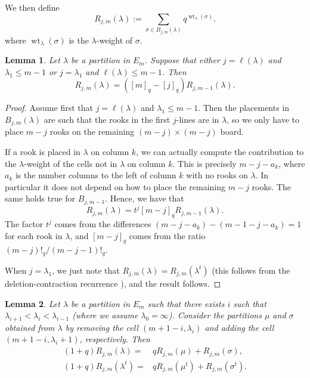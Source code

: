 \documentclass[10pt]{amsart}
\newtheorem{Lem}{Lemma}[section]
\theoremstyle{definition}
\DeclareMathOperator{\wt}{wt}
\begin{document}
We then define
\[
R_{j,m}(\lambda):=\sum_{\sigma\in B_{j,m}(\lambda) } q^{\wt_{\lambda}(\sigma)}.
\]
where $\wt_{\lambda}(\sigma)$ is the $\lambda$-weight of $\sigma$.
\begin{Lem}
\label{lem:Rjm}
Let $\lambda$ be a partition in $E_m$. Suppose that either $j=\ell(\lambda)$ and $\lambda_1\leq m-1$ or $j=\lambda_1$ and $\ell(\lambda)\leq m-1$. Then
\[
R_{j,m}(\lambda)=([m]_q-[j]_q)R_{j,m-1}(\lambda).
\]
\end{Lem}
\begin{proof}
Assume first that $j=\ell(\lambda)$ and $\lambda_1\leq m-1$. Then the placements in $B_{j,m}(\lambda)$ are such that the rooks in the first $j$-lines are in $\lambda$, so we only have to place $m-j$ rooks on the remaining $(m-j)\times (m-j)$ board.

If a rook is placed in $\lambda$ on column $k$, we can actually compute the contribution to the $\lambda$-weight of the cells not in $\lambda$ on column $k$. This is precisely $m-j-a_k$, where $a_k$ is the number columns to the left of column $k$ with no rooks on $\lambda$. In particular it does not depend on how to place the remaining $m-j$ rooks. The same holds true for $B_{j,m-1}$. Hence, we have that
\[
R_{j,m}(\lambda)=t^j[m-j]_qR_{j,m-1}(\lambda).
\]
The factor $t^j$ comes from the differences $(m-j-a_k)-(m-1-j-a_k)=1$ for each rook in $\lambda$, and $[m-j]_q$ comes from the ratio $(m-j)!_q/(m-j-1)!_q$.\par
 When $j=\lambda_1$, we just note that $R_{j,m}(\lambda)=R_{j,m}(\lambda^t)$ (this follows from the deletion-contraction recurrence \cite[Corollary 6.12]{Dworkin}), and the result follows.
\end{proof}
\begin{Lem}
\label{lem:Rjrel}
Let $\lambda$ be a partition in $E_m$ such that there exists $i$ such that $\lambda_{i+1}<\lambda_{i}<\lambda_{i-1}$ (where we assume $\lambda_0=\infty$). Consider the partitions $\mu$ and $\sigma$ obtained from $\lambda$ by removing the cell $(m+1-i,\lambda_i)$ and adding the cell $(m+1-i,\lambda_i+1)$, respectively. Then
\begin{align*}
(1+q)R_{j,m}(\lambda)=&qR_{j,m}(\mu)+R_{j,m}(\sigma),\\
(1+q)R_{j,m}(\lambda^{t})=&qR_{j,m}(\mu^{t})+R_{j,m}(\sigma^{t}).
\end{align*}

\end{Lem}
\end{document}
